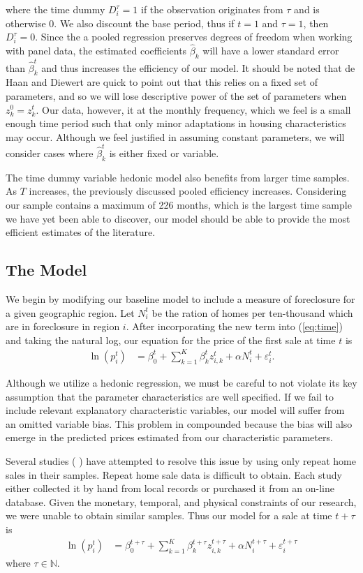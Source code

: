 \documentclass[12pt,oneside]{amsbook}
\newcommand{\eps}{\varepsilon^t_i}
\newcommand{\zet}{z^t}
\newcommand{\dos}{{t + \tau}}
\newcommand{\deps}{\varepsilon^\dos_i}
\begin{document}
where the time dummy $D^\tau_i = 1$ if the observation originates from $\tau$ and is otherwise $0$. We also discount the base period, thus if $t=1$ and $\tau=1$, then $D^\tau_i = 0$. Since the a pooled regression preserves degrees of freedom when working with panel data, the estimated coefficients $\hat{\beta}_k$ will have a lower standard error than $\hat{\beta}^t_k$ and thus increases the efficiency of our model. It should be noted that de Haan and Diewert are quick to point out that this relies on a fixed set of parameters, and so we will lose descriptive power of the set of parameters when $z_k^0 = z_k^t$. Our data, however, it at the monthly frequency, which we feel is a small enough time period such that only minor adaptations in housing characteristics may occur. Although we feel justified in assuming constant parameters, we will consider cases where $\hat{\beta}^t_k$ is either fixed or variable. 

The time dummy variable hedonic model also benefits from larger time samples. As $T$ increases, the previously discussed pooled efficiency increases. Considering our sample contains a maximum of 226 months, which is the largest time sample we have yet been able to discover, our model should be able to provide the most efficient estimates of the literature. 

\subsection{The Model}\label{sec:model}
We begin by modifying our baseline model to include a measure of foreclosure for a given geographic region. Let $N_i^t$ be the ration of homes per ten-thousand which are in foreclosure in region $i$. After incorporating the new term into (\ref{eq:time}) and taking the natural log, our equation for the price of the first sale at time $t$ is 
\begin{align}
\ln (p^t_{i}) & = \beta^t_0 + \sum^K_{k=1}\beta^t_k \zet_{i,k} + \alpha N_i^t +  \eps.
\end{align}

Although we utilize a hedonic regression, we must be careful to not violate its key assumption that the parameter characteristics are well specified. If we fail to include relevant explanatory characteristic variables, our model will suffer from an omitted variable bias. This problem in compounded because the bias will also emerge in the predicted prices estimated from our characteristic parameters. 

Several studies (\cite{Chi} \cite{Spillover} \cite{Boston} \cite{Strat}) have attempted to resolve this issue by using only repeat home sales in their samples. Repeat home sale data is difficult to obtain. Each study either collected it by hand from local records or purchased it from an on-line database. Given the monetary, temporal, and physical constraints of our research, we were unable to obtain similar samples. Thus our model for a sale at time $\dos$ is 
\begin{align}
\ln (p^t_{i}) & = \beta^\dos_0 + \sum^K_{k=1}\beta^\dos_k z^\dos_{i,k} + \alpha N_i^\dos + \deps \label{eq:fuck}
\end{align}
where $\tau \in \mathbb{N}$.
\end{document}
